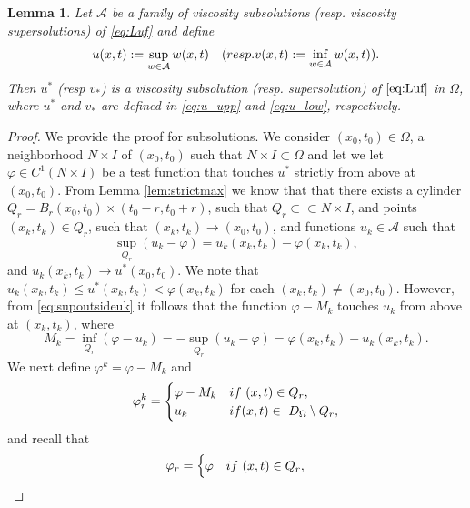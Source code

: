 \documentclass[10pt,a4paper]{amsart}
\newtheorem{lem}{Lemma}
\providecommand{\Ns}{N \times I}
\providecommand{\Rnp}{D_{\Omega}}
\begin{document}
\begin{lem}\label{lem:supsubissub}
    Let $\mathcal{A}$ be a family of viscosity subsolutions (resp. viscosity supersolutions) of \eqref{eq:Luf} and define 
    \begin{equation}\label{eq:sup_u}
        u(x,t):= \sup_{w \in \mathcal{A}} w(x,t) \quad (\textup{resp. } v(x,t):= \inf_{w \in \mathcal{A}} w(x,t) ).
    \end{equation}
Then $u^*$ (resp $v_*$) is a viscosity subsolution (resp. supersolution) of $\eqref{eq:Luf}$ in $\Omega$, where $u^*$ and $v_*$ are defined in \eqref{eq:u_upp} and \eqref{eq:u_low}, respectively.
\end{lem}

\begin{proof}
    We provide the proof for subsolutions. We consider $(x_0, t_0) \in \Omega$, a neighborhood $\Ns$ of $(x_0,t_0)$ such that $ \Ns \subset \Omega$ and let we let $\varphi \in C^1(\Ns)$ be a test function that touches $u^*$ strictly from above at $(x_0,t_0)$. From Lemma \ref{lem:strictmax} we know that that there exists a cylinder $Q_r=B_r(x_0,t_0) \times (t_0-r,t_0+r)$, such that $Q_r \subset \subset \Ns$, and points $(x_k,t_k) \in Q_r$, such that $(x_k,t_k)\to (x_0, t_0)$, and functions $u_k \in \mathcal{A}$ such that 
  \begin{equation}\label{eq:supoutsideuk}
         \sup_{Q_r } (u_k-\varphi) = u_k(x_k,t_k)-\varphi(x_k,t_k),
    \end{equation}
     and $u_k(x_k,t_k) \to u^*(x_0, t_0)$. We note that $u_k(x_k,t_k)\leq u^*(x_k,t_k) < \varphi(x_k,t_k)$ for each $(x_k,t_k) \neq (x_0,t_0)$. However, from \eqref{eq:supoutsideuk} it follows that the function $\varphi-M_k$ touches $u_k$ from above at $(x_k,t_k)$, where
     $$
     M_k = \inf_{Q_r} (\varphi-u_k) = -\sup_{Q_r } (u_k-\varphi) = \varphi(x_k,t_k)-u_k(x_k,t_k).
     $$
     We next define $\varphi^k=\varphi-M_k$ and
    \begin{align*}
     \varphi_{r }^k= \begin{cases}
                      \varphi-M_k & \textup{if  } \ (x,t) \in Q_r ,\\
                      u_k & \textup{if  } (x,t) \in \ \Rnp \setminus Q_r,
            \end{cases}
 \end{align*}
and recall that 
\begin{align*}
     \varphi_{r }= \begin{cases}
                      \varphi & \textup{if  } \ (x,t) \in Q_r ,\\

\end{cases}
\end{align*}
\end{proof}
\end{document}
